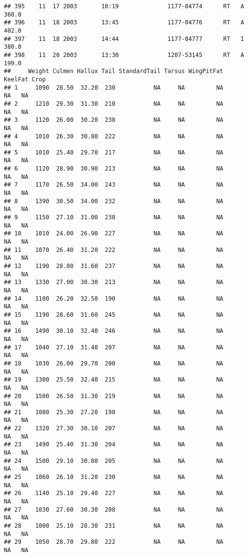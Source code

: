 \documentclass[
]{article}
\begin{document}
\begin{verbatim}
## 395    11  17 2003       10:19              1177-04774      RT   A     360.0
## 396    11  18 2003       13:45              1177-04776      RT   A     402.0
## 397    11  18 2003       14:44              1177-04777      RT   I     380.0
## 398    11  20 2003       13:30              1207-53145      RT   A     199.0
##     Weight Culmen Hallux Tail StandardTail Tarsus WingPitFat KeelFat Crop
## 1     1090  28.50  32.20  230           NA     NA         NA      NA   NA
## 2     1210  29.30  31.30  210           NA     NA         NA      NA   NA
## 3     1120  26.00  30.20  238           NA     NA         NA      NA   NA
## 4     1010  26.30  30.80  222           NA     NA         NA      NA   NA
## 5     1010  25.40  29.70  217           NA     NA         NA      NA   NA
## 6     1120  28.90  30.90  213           NA     NA         NA      NA   NA
## 7     1170  26.50  34.00  243           NA     NA         NA      NA   NA
## 8     1390  30.50  34.00  232           NA     NA         NA      NA   NA
## 9     1150  27.10  31.00  238           NA     NA         NA      NA   NA
## 10    1010  24.00  26.90  227           NA     NA         NA      NA   NA
## 11    1070  26.40  31.20  222           NA     NA         NA      NA   NA
## 12    1190  28.80  31.60  237           NA     NA         NA      NA   NA
## 13    1330  27.00  30.30  213           NA     NA         NA      NA   NA
## 14    1100  26.20  32.50  190           NA     NA         NA      NA   NA
## 15    1190  28.60  31.60  245           NA     NA         NA      NA   NA
## 16    1490  30.10  32.40  246           NA     NA         NA      NA   NA
## 17    1040  27.10  31.40  207           NA     NA         NA      NA   NA
## 18    1030  26.00  29.70  200           NA     NA         NA      NA   NA
## 19    1300  25.50  32.40  215           NA     NA         NA      NA   NA
## 20    1500  26.50  31.30  219           NA     NA         NA      NA   NA
## 21    1080  25.30  27.20  198           NA     NA         NA      NA   NA
## 22    1320  27.30  30.10  207           NA     NA         NA      NA   NA
## 23    1490  25.40  31.30  204           NA     NA         NA      NA   NA
## 24    1500  29.10  30.80  205           NA     NA         NA      NA   NA
## 25    1060  26.10  31.20  230           NA     NA         NA      NA   NA
## 26    1140  25.10  29.40  227           NA     NA         NA      NA   NA
## 27    1030  27.60  30.30  208           NA     NA         NA      NA   NA
## 28    1000  25.10  28.30  231           NA     NA         NA      NA   NA
## 29    1050  28.70  29.80  222           NA     NA         NA      NA   NA

\end{verbatim}
\end{document}
